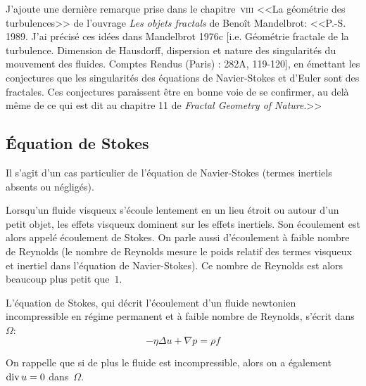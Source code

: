 \begin{histoire}
J'ajoute une dernière remarque prise dans le chapitre~\textsc{viii} <<La géométrie des turbulences>> de l'ouvrage \emph{Les objets fractals} de Benoît Mandelbrot:
<<P.-S. 1989. J'ai précisé ces idées dans Mandelbrot 1976c [i.e. Géométrie fractale de la turbulence. Dimension de Hausdorff, dispersion et nature des singularités du mouvement des fluides. Comptes Rendus (Paris) : 282A, 119-120], en émettant les conjectures que les singularités des équations de Navier-Stokes et d'Euler sont des fractales. Ces conjectures paraissent être en bonne voie de se confirmer, au delà même de ce qui est dit au chapitre 11 de \emph{Fractal Geometry of Nature}.>>
\end{histoire}


\medskip
\subsection{Équation de Stokes}

Il s'agit d'un cas particulier de l'équation de Navier-Stokes (termes inertiels absents ou négligés).

Lorsqu'un fluide visqueux s'écoule lentement en un lieu étroit ou autour d'un petit objet, les effets visqueux dominent sur les effets inertiels. Son écoulement est alors appelé écoulement de Stokes. On parle aussi d'écoulement à faible nombre de Reynolds (le nombre de Reynolds mesure le poids relatif des termes visqueux et inertiel dans l'équation de Navier-Stokes). Ce nombre de Reynolds est alors beaucoup plus petit que~$1$.

\medskip
L'équation de Stokes, qui décrit l'écoulement d'un fluide newtonien incompressible en régime permanent et à faible nombre de Reynolds, s'écrit dans~$\Omega$:
\begin{equation}
-\eta \Delta u + \nabla p = \rho f
\end{equation}

On rappelle que si de plus le fluide est incompressible, alors on a également 
$\operatorname{div} u = 0$ dans~$\Omega$.


